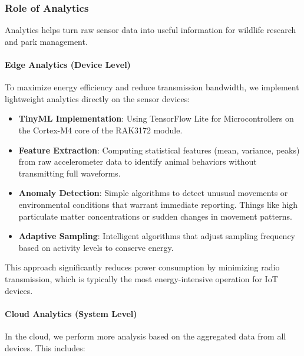 \subsubsection{Role of Analytics}

Analytics helps turn raw sensor data into useful information for wildlife research and park management.

\paragraph{Edge Analytics (Device Level)}
To maximize energy efficiency and reduce transmission bandwidth, we implement lightweight analytics directly on the sensor devices:

\begin{itemize}
  \item \textbf{TinyML Implementation}: Using TensorFlow Lite for Microcontrollers on the Cortex-M4 core of the RAK3172 module.
  \item \textbf{Feature Extraction}: Computing statistical features (mean, variance, peaks) from raw accelerometer data to identify animal behaviors without transmitting full waveforms.
  \item \textbf{Anomaly Detection}: Simple algorithms to detect unusual movements or environmental conditions that warrant immediate reporting. Things like high particulate matter concentrations or sudden changes in movement patterns.
  \item \textbf{Adaptive Sampling}: Intelligent algorithms that adjust sampling frequency based on activity levels to conserve energy.
\end{itemize}

This approach significantly reduces power consumption by minimizing radio transmission, which is typically the most energy-intensive operation for IoT devices.

\paragraph{Cloud Analytics (System Level)}
In the cloud, we perform more analysis based on the aggregated data from all devices. This includes:

